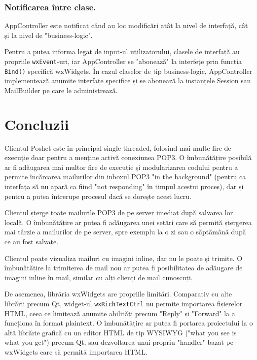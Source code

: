 \documentclass[runningheads]{llncs}
\begin{document}
\newpage

\subsubsection{Notificarea între clase.} AppController este notificat când au loc modificări atât la nivel de interfață, cât și la nivel de "business-logic".

Pentru a putea informa legat de input-ul utilizatorului, clasele de interfață au propriile \texttt{wxEvent}-uri, iar AppController se "abonează" la interfețe prin funcția \texttt{Bind()} specifică wxWidgets. În cazul claselor de tip business-logic, AppController implementează anumite interfațe specifice și se abonează la instanțele Session sau MailBuilder pe care le administrează.



\section{Concluzii}

Clientul Poshet este în principal single-threaded, folosind mai multe fire de execuție doar pentru a menține activă conexiunea POP3. O îmbunătățire posibilă ar fi adăugarea mai multor fire de execuție și modularizarea codului pentru a permite încărcarea mailurilor din inboxul POP3 "in the background" (pentru ca interfața să nu apară ca fiind "not responding" în timpul acestui proces), dar și pentru a putea întrerupe procesul dacă se dorește acest lucru.

Clientul șterge toate mailurile POP3 de pe server imediat după salvarea lor locală. O îmbunătățire ar putea fi adăugarea unei setări care să permită ștergerea mai târzie a mailurilor de pe server, spre exemplu la o zi sau o săptămână după ce au fost salvate.

Clientul poate vizualiza mailuri cu imagini inline, dar nu le poate și trimite. O îmbunătățire la trimiterea de mail nou ar putea fi posibilitatea de adăugare de imagini inline în mail, similar cu alți clienți de mail cunoscuți.

De asemenea, librăria wxWidgets are propriile limitări. Comparativ cu alte librării precum Qt, widget-ul \texttt{wxRichTextCtrl} nu permite importarea fișierelor HTML, ceea ce limitează anumite abilități precum "Reply" și "Forward" la a funcționa în format plaintext. O îmbunătățire ar putea fi portarea proiectului la o altă librărie grafică cu un editor HTML de tip WYSIWYG ("what you see is what you get") precum Qt, sau dezvoltarea unui propriu "handler" bazat pe wxWidgets care să permită importarea HTML.
%
%
%
% 
% 
\end{document}
